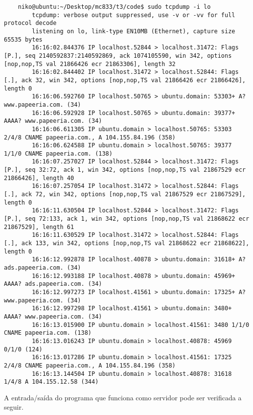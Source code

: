 \documentclass[a4paper,10pt]{article}
\begin{document}
    \begin{lstlisting}
    niko@ubuntu:~/Desktop/mc833/t3/code$ sudo tcpdump -i lo
        tcpdump: verbose output suppressed, use -v or -vv for full protocol decode
        listening on lo, link-type EN10MB (Ethernet), capture size 65535 bytes
        16:16:02.844376 IP localhost.52844 > localhost.31472: Flags [P.], seq 2140592837:2140592869, ack 1074105590, win 342, options [nop,nop,TS val 21866426 ecr 21863306], length 32
        16:16:02.844402 IP localhost.31472 > localhost.52844: Flags [.], ack 32, win 342, options [nop,nop,TS val 21866426 ecr 21866426], length 0
        16:16:06.592760 IP localhost.50765 > ubuntu.domain: 53303+ A? www.papeeria.com. (34)
        16:16:06.592928 IP localhost.50765 > ubuntu.domain: 39377+ AAAA? www.papeeria.com. (34)
        16:16:06.611305 IP ubuntu.domain > localhost.50765: 53303 2/4/8 CNAME papeeria.com., A 104.155.84.196 (358)
        16:16:06.624588 IP ubuntu.domain > localhost.50765: 39377 1/1/0 CNAME papeeria.com. (138)
        16:16:07.257027 IP localhost.52844 > localhost.31472: Flags [P.], seq 32:72, ack 1, win 342, options [nop,nop,TS val 21867529 ecr 21866426], length 40
        16:16:07.257054 IP localhost.31472 > localhost.52844: Flags [.], ack 72, win 342, options [nop,nop,TS val 21867529 ecr 21867529], length 0
        16:16:11.630504 IP localhost.52844 > localhost.31472: Flags [P.], seq 72:133, ack 1, win 342, options [nop,nop,TS val 21868622 ecr 21867529], length 61
        16:16:11.630529 IP localhost.31472 > localhost.52844: Flags [.], ack 133, win 342, options [nop,nop,TS val 21868622 ecr 21868622], length 0
        16:16:12.992878 IP localhost.40878 > ubuntu.domain: 31618+ A? ads.papeeria.com. (34)
        16:16:12.993188 IP localhost.40878 > ubuntu.domain: 45969+ AAAA? ads.papeeria.com. (34)
        16:16:12.997273 IP localhost.41561 > ubuntu.domain: 17325+ A? www.papeeria.com. (34)
        16:16:12.997298 IP localhost.41561 > ubuntu.domain: 3480+ AAAA? www.papeeria.com. (34)
        16:16:13.015900 IP ubuntu.domain > localhost.41561: 3480 1/1/0 CNAME papeeria.com. (138)
        16:16:13.016243 IP ubuntu.domain > localhost.40878: 45969 0/1/0 (124)
        16:16:13.017286 IP ubuntu.domain > localhost.41561: 17325 2/4/8 CNAME papeeria.com., A 104.155.84.196 (358)
        16:16:13.144504 IP ubuntu.domain > localhost.40878: 31618 1/4/8 A 104.155.12.58 (344)

    \end{lstlisting}
    
    A entrada/saída do programa que funciona como servidor pode ser verificada a seguir.
    
\end{document}
